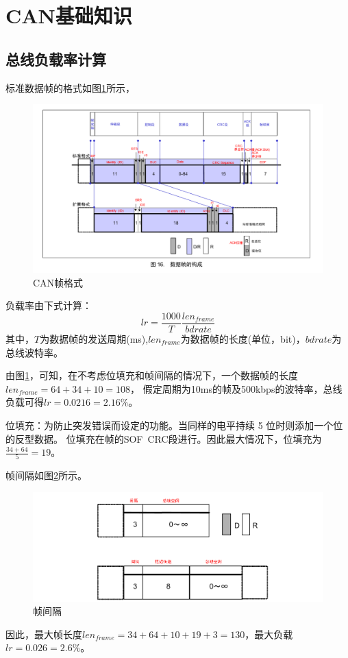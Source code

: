 \section{CAN基础知识}
\subsection{总线负载率计算}
标准数据帧的格式如图\ref{fig:can_frame}所示，
\begin{figure}[ht]
    \centering
    \includegraphics[scale=0.7]{pic/can_frame.png}
    \caption{CAN帧格式}
    \label{fig:can_frame}
\end{figure}

负载率由下式计算\cite{url_can_load_rate}：
$$lr = \frac{1000}{T} \frac{len_{frame}}{bdrate} $$
其中，$T$为数据帧的发送周期(ms),$len_{frame}$为数据帧的长度(单位，bit)，$bdrate$为总线波特率。

由图\ref{fig:can_frame}，可知，在不考虑位填充和帧间隔的情况下，一个数据帧的长度$len_{frame}=64+34+10=108$，
假定周期为10ms的帧及500kbps的波特率，总线负载可得$lr=0.0216=2.16\%$。

位填充：为防止突发错误而设定的功能。当同样的电平持续 5 位时则添加一个位的反型数据。 
位填充在帧的SOF~CRC段进行。因此最大情况下，位填充为$\frac{34+64}{5}=19$。

帧间隔如图\ref{fig:frame_jiange}所示。
\begin{figure}[ht]
    \centering
    \includegraphics[scale=0.8]{pic/frame_jiange.png}
    \caption{帧间隔}
    \label{fig:frame_jiange}
\end{figure}
因此，最大帧长度$len_{frame}=34+64+10+19+3=130$，最大负载$lr=0.026=2.6\%$。

